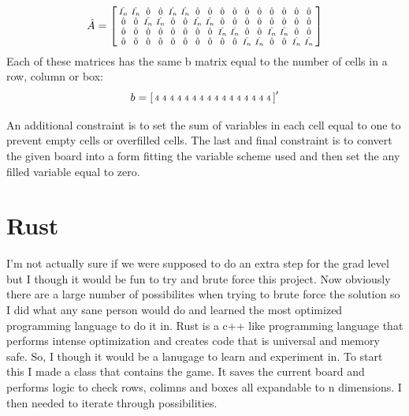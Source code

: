 \documentclass[12pt]{article}
\begin{document}
$$
\hat{A} =
\begin{bsmallmatrix}
\hat{I_n} & \hat{I_n} & \hat{0} & \hat{0} & \hat{I_n} & \hat{I_n} & \hat{0} & \hat{0} & \hat{0} & \hat{0} & \hat{0} & \hat{0} & \hat{0} & \hat{0} & \hat{0} & \hat{0} \\
\hat{0} & \hat{0} & \hat{I_n} & \hat{I_n} & \hat{0} & \hat{0} & \hat{I_n} & \hat{I_n} & \hat{0} & \hat{0} & \hat{0} & \hat{0} & \hat{0} & \hat{0} & \hat{0} & \hat{0} \\
\hat{0} & \hat{0} & \hat{0} & \hat{0} & \hat{0} & \hat{0} & \hat{0} & \hat{0} & \hat{I_n} & \hat{I_n} & \hat{0} & \hat{0} & \hat{I_n} & \hat{I_n} & \hat{0} & \hat{0} \\
\hat{0} & \hat{0} & \hat{0} & \hat{0} & \hat{0} & \hat{0} & \hat{0} & \hat{0} & \hat{0} & \hat{0} & \hat{I_n} & \hat{I_n} & \hat{0} & \hat{0} & \hat{I_n} & \hat{I_n} \\
\end{bsmallmatrix}
$$
Each of these matrices has the same b matrix equal to the number of cells in a row, column or box:
$$
b = 
\begin{bsmallmatrix}
4 & 4 & 4 & 4 & 4 & 4 & 4 & 4 & 4 & 4 & 4 & 4 & 4 & 4 & 4 & 4 \\ 
\end{bsmallmatrix}'
$$

An additional constraint is to set the sum of variables in each cell equal to one to prevent empty cells or overfilled cells. The last and final constraint is to convert
the given board into a form fitting the variable scheme used and then set the any filled variable equal to zero.

\section{Rust}
I'm not actually sure if we were supposed to do an extra step for the grad level but I though it would be fun to try and brute force this project. Now obviously there
are a large number of possibilites when trying to brute force the solution so I did what any sane person would do and learned the most optimized programming language
to do it in. Rust is a c++ like programming language that performs intense optimization and creates code that is universal and memory safe. So, I though it would be a
lanugage to learn and experiment in. To start this I made a class that contains the game. It saves the current board and performs logic to check rows, colimns and boxes 
all expandable to n dimensions. I then needed to iterate through possibilities. 
\end{document}
